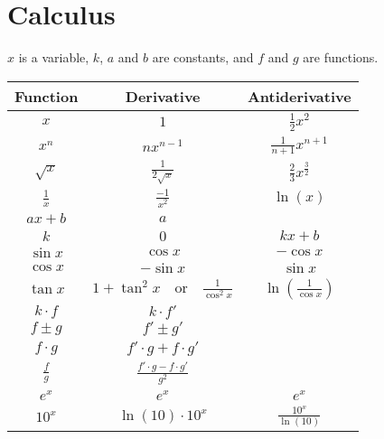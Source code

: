 \section{Calculus}
$x$ is a variable, $k$, $a$ and $b$ are constants, and $f$ and $g$ are functions.
\begin{center}
    \begin{longtable}{c|c|c}
        \textbf{Function} & \textbf{Derivative} & \textbf{Antiderivative}
        \\[0.25cm] \hline
        $x$ & $1$ & $\frac{1}{2}x^2$
        \\
        $x^n$ & $nx^{n - 1}$ & $\frac{1}{n + 1}x^{n + 1}$
        \\
        $\sqrt{x}$ & $\frac{1}{2 \sqrt{x}}$ & $\frac{2}{3}x^\frac{3}{2}$
        \\
        $\frac{1}{x}$ & $\frac{-1}{x^2}$ & $\ln(x)$
        \\
        $ax + b$ & $a$
        \\
        $k$ & $0$ & $kx + b$
        \\
        $\sin{x}$ & $\cos{x}$ & $-\cos{x}$
        \\
        $\cos{x}$ & $-\sin{x}$ & $\sin{x}$
        \\
        $\tan{x}$ & $1 + \tan^2{x} \quad \text{or} \quad \frac{1}{\cos^2{x}}$ & $\ln\left(\frac{1}{\cos{x}}\right)$
        \\
        $k \cdot f$ & $k \cdot f'$
        \\
        $f \pm g$ & $f' \pm g'$
        \\
        $f \cdot g$ & $f' \cdot g + f \cdot g'$
        \\
        $\frac{f}{g}$ & $\frac{f' \cdot g - f \cdot g'}{g^2}$
        \\
        $e^x$ & $e^x$ & $e^x$
        \\
        $10^x$ & $\ln(10) \cdot 10^x$ & $\frac{10^x}{\ln(10)}$
    \end{longtable}
\end{center}

